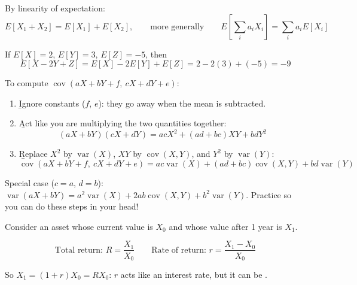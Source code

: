 By linearity of expectation:
\[E[X_1 + X_2] = E[X_1] + E[X_2], \qquad \text{more generally} \qquad \boxed{E\left[\sum_i a_iX_i\right] = \sum_i a_iE[X_i]}\]

\begin{example}
    If $E[X] = 2$, $E[Y] = 3$, $E[Z] = -5$, then
    \[E[X - 2Y + Z] = E[X] - 2E[Y] + E[Z] = 2 - 2(3) + (-5) = -9\]
\end{example}

To compute $\operatorname{cov}(aX + bY + f,\ cX + dY + e)$:
\begin{enumerate}
    \item \b{Ignore constants} ($f$, $e$): they go away when the mean is subtracted.
    \item \b{Act like you are multiplying} the two quantities together:
    \[(aX + bY)(cX + dY) = acX^2 + (ad + bc)XY + bdY^2\]
    \item \b{Replace} $X^2$ by $\operatorname{var}(X)$, $XY$ by $\operatorname{cov}(X,Y)$, and $Y^2$ by $\operatorname{var}(Y)$:
    \[\boxed{\operatorname{cov}(aX + bY + f,\ cX + dY + e) = ac\operatorname{var}(X) + (ad + bc)\operatorname{cov}(X,Y) + bd\operatorname{var}(Y)}\]
\end{enumerate}
Special case ($c = a$, $d = b$): $\operatorname{var}(aX + bY) = a^2\operatorname{var}(X) + 2ab\operatorname{cov}(X,Y) + b^2\operatorname{var}(Y)$. Practice so you can do these steps in your head!

Consider an asset whose current value is $X_0$ and whose value after 1 year is $X_1$.
\begin{center}
\end{center}
\begin{definition}
    \[\boxed{\text{Total return: } R = \frac{X_1}{X_0} \qquad \text{Rate of return: } r = \frac{X_1 - X_0}{X_0}}\]
\end{definition}
So $X_1 = (1+r)X_0 = RX_0$: $r$ acts like an interest rate, but it can be .


